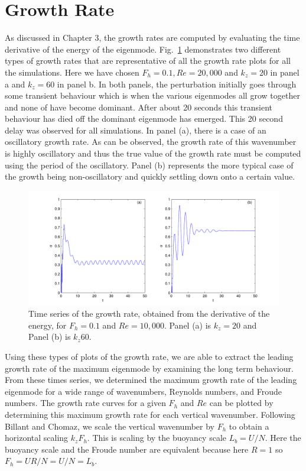 \section{Growth Rate}
As discussed in Chapter 3, the growth rates are computed by evaluating the time derivative of the energy of the eigenmode. Fig.~\ref{sigma_examples} demonstrates two different types of growth rates that are representative of all the growth rate plots for all the simulations. Here we have chosen $F_{h}=0.1, Re=20{,}000$ and $k_{z}=20$ in panel a and $k_{z}=60$ in panel b. In both panels, the perturbation initially goes through some transient behaviour which is when the various eigenmodes all grow together and none of have become dominant. After about 20 seconds this transient behaviour has died off the dominant eigenmode has emerged. This 20 second delay was observed for all simulations. In panel (a), there is a case of an oscillatory growth rate. As can be observed, the growth rate of this wavenumber is highly oscillatory and thus the true value of the growth rate must be computed using the period of the oscillatory. Panel (b) represents the more typical case of the growth being non-oscillatory and quickly settling down onto a certain value. 
\begin{figure}
\begin{center}
\includegraphics[width=\textwidth]{sigma_examples.pdf}
\caption{Time series of the growth rate, obtained from the derivative of the energy, for $F_{h}=0.1$ and $Re=10{,}000$. Panel (a) is $k_{z}=20$ and Panel (b) is $k_{z}60$.}
\label{sigma_examples}
\end{center}
\end{figure}

Using these types of plots of the growth rate, we are able to extract the leading growth rate of the maximum eigenmode by examining the long term behaviour. From these times series, we determined the maximum growth rate of the leading eigenmode for a wide range of wavenumbers, Reynolds numbers, and Froude numbers. The growth rate curves for a given $F_{h}$ and $Re$ can be plotted by determining this maximum growth rate for each vertical wavenumber. Following Billant and Chomaz\cite{bc2000c}, we scale the vertical wavenumber by $F_{h}$ to obtain a horizontal scaling $k_{z}F_{h}$. This is scaling by the buoyancy scale $L_{b} = U/N$. Here the buoyancy scale and the Froude number are equivalent because here $R=1$ so $F_{h}=UR/N=U/N=L_{b}$. 

